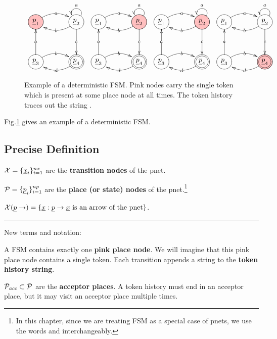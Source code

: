 \begin{figure}[h!]
$$
\begin{array}{cccc}
\xymatrix@C=3pc@R=3pc{
\PinkCircle{\rvp_1}\ar@/^1pc/[r]|a
&
\Circle{\rvp_2}\ar@/^1pc/[l]|b
\ar[d]|c \ar@(ru,lu)[]_a
\\
\Circle{\rvp_3}\ar@/^1pc/[r]|b
\ar[u]|a
&\DCircle{\rvp_4}\ar@/^1pc/[l]|d
}&
\xymatrix@C=3pc@R=3pc{
\Circle{\rvp_1}\ar@/^1pc/[r]|a
&
\PinkCircle{\rvp_2}\ar@/^1pc/[l]|b
\ar[d]|c \ar@(ru,lu)[]_a
\\
\Circle{\rvp_3}\ar@/^1pc/[r]|b
\ar[u]|a
&\DCircle{\rvp_4}\ar@/^1pc/[l]|d
}&
\xymatrix@C=3pc@R=3pc{
\Circle{\rvp_1}\ar@/^1pc/[r]|a
&
\PinkCircle{\rvp_2}\ar@/^1pc/[l]|b
\ar[d]|c \ar@(ru,lu)[]_a
\\
\Circle{\rvp_3}\ar@/^1pc/[r]|b
\ar[u]|a
&\DCircle{\rvp_4}\ar@/^1pc/[l]|d
}&
\xymatrix@C=3pc@R=3pc{
\Circle{\rvp_1}\ar@/^1pc/[r]|a
&
\Circle{\rvp_2}\ar@/^1pc/[l]|b
\ar[d]|c \ar@(ru,lu)[]_a
\\
\Circle{\rvp_3}\ar@/^1pc/[r]|b
\ar[u]|a
&\PinkDCircle{\rvp_4}\ar@/^1pc/[l]|d
}
\end{array}
$$
\caption{Example of a deterministic FSM. Pink nodes carry the single token which is present at 
some place node at all times.
The token history traces out the string .}
\label{fig-det-fsm}
\end{figure}
Fig.\ref{fig-det-fsm}
gives an example of a deterministic
FSM.

\subsection{Precise Definition}


$\calx =\{\rvx_i\}_{i=1}^{nx}$ are the {\bf transition nodes} of the pnet.

$\calp =\{\rvp_i\}_{i=1}^{np}$ are the {\bf place (or state) nodes} of the pnet.\footnote{In this
chapter, since we are treating FSM as a special case of pnets, we use the words  and
 interchangeably.}

$\calx(\rvp\rarrow)=\{\rvx: \rvp\rarrow\rvx \text{ is an arrow of the pnet}\}$.

\hrule
New terms and notation:

A FSM contains exactly one {\bf pink place node}. We will 
imagine that this pink place node contains a single token.
Each transition appends a string to the {\bf token history string}.

${\cal P}_{acc}\subset {\cal P}$ are the 
{\bf acceptor places}. A token history must end in an acceptor place, but it may visit
an acceptor place multiple times.

